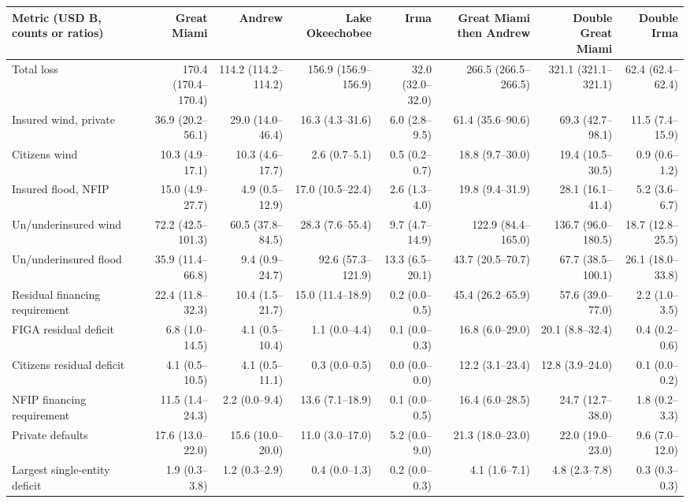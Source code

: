 \begin{tabular}{lrrrrrrr}
\toprule
Metric (USD B, counts or ratios) & Great Miami & Andrew & Lake Okeechobee & Irma & Great Miami then Andrew & Double Great Miami & Double Irma \\
\midrule
Total loss & 170.4 (170.4--170.4) & 114.2 (114.2--114.2) & 156.9 (156.9--156.9) & 32.0 (32.0--32.0) & 266.5 (266.5--266.5) & 321.1 (321.1--321.1) & 62.4 (62.4--62.4) \\
Insured wind, private & 36.9 (20.2--56.1) & 29.0 (14.0--46.4) & 16.3 (4.3--31.6) & 6.0 (2.8--9.5) & 61.4 (35.6--90.6) & 69.3 (42.7--98.1) & 11.5 (7.4--15.9) \\
Citizens wind & 10.3 (4.9--17.1) & 10.3 (4.6--17.7) & 2.6 (0.7--5.1) & 0.5 (0.2--0.7) & 18.8 (9.7--30.0) & 19.4 (10.5--30.5) & 0.9 (0.6--1.2) \\
Insured flood, NFIP & 15.0 (4.9--27.7) & 4.9 (0.5--12.9) & 17.0 (10.5--22.4) & 2.6 (1.3--4.0) & 19.8 (9.4--31.9) & 28.1 (16.1--41.4) & 5.2 (3.6--6.7) \\
Un/underinsured wind & 72.2 (42.5--101.3) & 60.5 (37.8--84.5) & 28.3 (7.6--55.4) & 9.7 (4.7--14.9) & 122.9 (84.4--165.0) & 136.7 (96.0--180.5) & 18.7 (12.8--25.5) \\
Un/underinsured flood & 35.9 (11.4--66.8) & 9.4 (0.9--24.7) & 92.6 (57.3--121.9) & 13.3 (6.5--20.1) & 43.7 (20.5--70.7) & 67.7 (38.5--100.1) & 26.1 (18.0--33.8) \\
\midrule
Residual financing requirement & 22.4 (11.8--32.3) & 10.4 (1.5--21.7) & 15.0 (11.4--18.9) & 0.2 (0.0--0.5) & 45.4 (26.2--65.9) & 57.6 (39.0--77.0) & 2.2 (1.0--3.5) \\
FIGA residual deficit & 6.8 (1.0--14.5) & 4.1 (0.5--10.4) & 1.1 (0.0--4.4) & 0.1 (0.0--0.3) & 16.8 (6.0--29.0) & 20.1 (8.8--32.4) & 0.4 (0.2--0.6) \\
Citizens residual deficit & 4.1 (0.5--10.5) & 4.1 (0.5--11.1) & 0.3 (0.0--0.5) & 0.0 (0.0--0.0) & 12.2 (3.1--23.4) & 12.8 (3.9--24.0) & 0.1 (0.0--0.2) \\
NFIP financing requirement & 11.5 (1.4--24.3) & 2.2 (0.0--9.4) & 13.6 (7.1--18.9) & 0.1 (0.0--0.5) & 16.4 (6.0--28.5) & 24.7 (12.7--38.0) & 1.8 (0.2--3.3) \\
\midrule
Private defaults & 17.6 (13.0--22.0) & 15.6 (10.0--20.0) & 11.0 (3.0--17.0) & 5.2 (0.0--9.0) & 21.3 (18.0--23.0) & 22.0 (19.0--23.0) & 9.6 (7.0--12.0) \\
Largest single-entity deficit & 1.9 (0.3--3.8) & 1.2 (0.3--2.9) & 0.4 (0.0--1.3) & 0.2 (0.0--0.3) & 4.1 (1.6--7.1) & 4.8 (2.3--7.8) & 0.3 (0.3--0.3) \\

\end{tabular}
